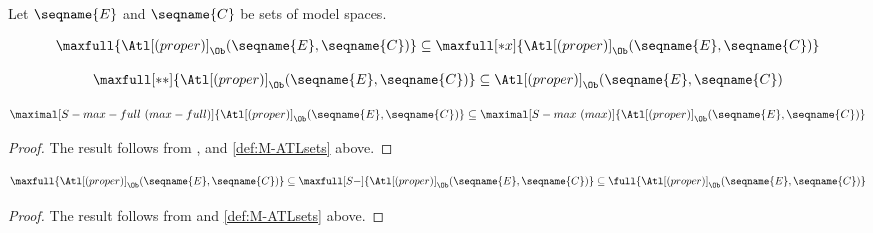 \documentclass{article}
\begin{document}
\begin{lemma}
\label{lem:M-ATLsets}

Let $\seqname{E}$ and $\seqname{C}$ be sets of model spaces.

\begin{equation}
  \maxfull{\Atl[(proper)]_\Ob(\seqname{E}, \seqname{C})} \subseteq
  \maxfull[*x]{\Atl[(proper)]_\Ob(\seqname{E}, \seqname{C})}
\end{equation}

\begin{equation}
  \maxfull[**]{\Atl[(proper)]_\Ob(\seqname{E}, \seqname{C})} \subseteq
  \Atl[(proper)]_\Ob(\seqname{E}, \seqname{C})
\end{equation}

\begin{equation}
  \maximal[S-max-full~(max-full)]{\Atl[(proper)]_\Ob(\seqname{E}, \seqname{C})}
  \subseteq
  \maximal[S-max~(max)]{\Atl[(proper)]_\Ob(\seqname{E}, \seqname{C})}
\end{equation}

\begin{proof}
The result follows from
{
  \showlabelsinline
  ,
}
and \cref{def:M-ATLsets} above.
\end{proof}

\begin{equation}
  \maxfull{\Atl[(proper)]_\Ob(\seqname{E}, \seqname{C})} \subseteq
  \maxfull[S-]{\Atl[(proper)]_\Ob(\seqname{E}, \seqname{C})} \subseteq
  \full{\Atl[(proper)]_\Ob(\seqname{E}, \seqname{C})}
\end{equation}

\begin{proof}
The result follows from  and \cref{def:M-ATLsets}
above.
\end{proof}
\end{lemma}
\end{document}
